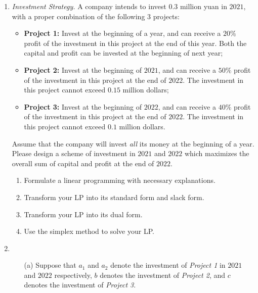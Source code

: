 \documentclass[12pt,a4paper]{article}
\makeatletter
\newtheorem*{solution}{Solution}
\theoremstyle{definition}
\renewenvironment{solution}[1][Solution] {\par\pushQED{\qed}\normalfont\topsep6\p@\@plus6\p@\relax\trivlist\item[\hskip\labelsep\bfseries#1\@addpunct{.}]\ignorespaces}{\popQED\endtrivlist\@endpefalse} \makeatother
\makeatother
\begin{document}
\begin{enumerate}
    
    \item
    \textit{Investment Strategy.} A company intends to invest $0.3$ million yuan in $2021$, with a proper combination of the following $3$ projects:
    \begin{itemize}
    \item \textbf{Project 1:} Invest at the beginning of a year, and can receive a $20\%$ profit of the investment in this project at the end of this year. Both the capital and profit can be invested at the beginning of next year;
    \item \textbf{Project 2:} Invest at the beginning of $2021$, and can receive a $50\%$ profit of the investment in this project at the end of $2022$. The investment in this project cannot exceed $0.15$ million dollars;
    \item \textbf{Project 3:} Invest at the beginning of $2022$, and can receive a $40\%$ profit of the investment in this project at the end of $2022$. The investment in this project cannot exceed $0.1$ million dollars.
    \end{itemize}
    Assume that the company will invest \emph{all} its money at the beginning of a year. Please design a scheme of investment in $2021$ and $2022$ which maximizes the overall sum of capital and profit at the end of $2022$.
    \begin{enumerate}
    \item
    Formulate a linear programming with necessary explanations.

    \item
    Transform your LP into its standard form and slack form.

    \item
    Transform your LP into its dual form.

    \item
    Use the simplex method to solve your LP.
    \end{enumerate}
    \begin{solution}
    ~\\
    \begin{enumerate}
        \item [(a)] 
        Suppose that $a_1$ and $a_2$ denote the investment of \emph{Project 1} in $2021$ and $2022$ respectively, $b$ denotes the investment of \emph{Project 2}, and $c$ denotes the investment of \emph{Project 3}.
        

\end{enumerate}
\end{solution}
\end{enumerate}
\end{document}
